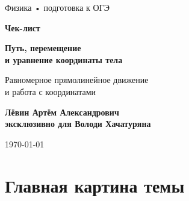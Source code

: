 \documentclass[a4paper,12pt]{article}
\begin{document}
\begin{titlepage}
\thispagestyle{empty}

\begin{center}

\vspace*{2.5cm}

{\large\color{softgray}Физика • подготовка к ОГЭ}

\vspace{1.2cm}

{\fontsize{31}{36}\selectfont\bfseries\color{darkaccent}
Чек-лист}

\vspace{0.7cm}

{\LARGE\bfseries
Путь, перемещение\\[0.2em]
и уравнение координаты тела}

\vspace{1.1cm}

{\large
Равномерное прямолинейное движение\\
и работа с координатами}

\vfill

{\large\bfseries
Лёвин Артём Александрович\\[0.3em]
эксклюзивно для Володи Хачатуряна}

\vspace{0.9cm}

{\large \today}

\vspace{1.7cm}


\vspace{0.7cm}

\end{center}
\end{titlepage}


\section{Главная картина темы}
\end{document}
